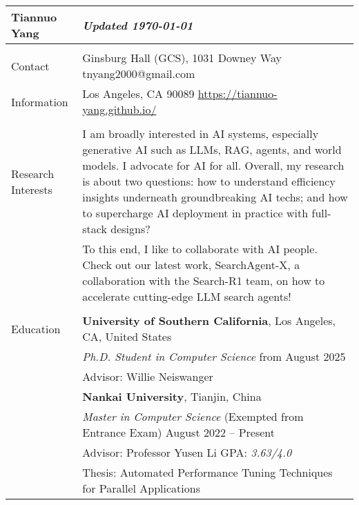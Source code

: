 \documentclass[letterpaper, 10pt]{article}
\begin{document}
\begin{longtable}{p{}p{}}

\textbf{Tiannuo Yang} & \hfill{\it\footnotesize Updated \today} \\
\hline \\



\textcolor{OliveGreen}{Contact} & Ginsburg Hall (GCS), 1031 Downey Way \hfill tnyang2000@gmail.com \\
\textcolor{OliveGreen}{Information} & Los Angeles, CA 90089 \hfill  \url{https://tiannuo-yang.github.io/} \\
& \\



\nohyphens{\textcolor{OliveGreen}{Research Interests}}
& I am broadly interested in AI systems, especially generative AI such as LLMs, RAG, agents, and world models. I advocate for AI for all. Overall, my research is about two questions: how to understand efficiency insights underneath groundbreaking AI techs; and how to supercharge AI deployment in practice with full-stack designs?
\vspace{0.01\textwidth} \\

& To this end, I like to collaborate with AI people. Check out our latest work, SearchAgent-X, a collaboration with the Search-R1 team, on how to accelerate cutting-edge LLM search agents!\\
& \\



\textcolor{OliveGreen}{Education} 
& \textbf{University of Southern California}, Los Angeles, CA, United States \\
& \textcolor[RGB]{200, 0, 0}{\textit{Ph.D. Student in Computer Science}} \hfill from August 2025 \\
& Advisor: Willie Neiswanger \vspace{0.01\textwidth} \\

& \textbf{Nankai University}, Tianjin, China \\ 
& \textit{Master in Computer Science} (Exempted from Entrance Exam) \hfill August 2022 -- Present \\
& Advisor: Professor Yusen Li \hspace{0.04\textwidth} GPA: \textit{3.63/4.0} \\
& Thesis: Automated Performance Tuning Techniques for Parallel Applications \vspace{0.01\textwidth} \\


\end{longtable}
\end{document}
